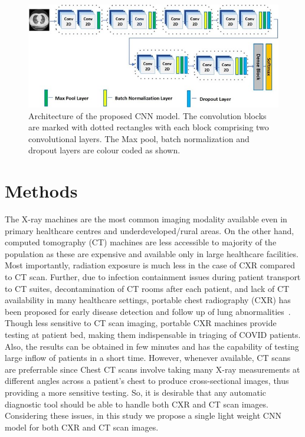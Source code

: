 \documentclass[10pt,journal,compsoc]{IEEEtran}
\begin{document}
\begin{figure}[!t]
\centering
\includegraphics[width=7.0in]{Picture1.jpg}
\caption{Architecture of the proposed CNN model. The convolution blocks are marked with dotted rectangles with each block comprising two convolutional layers. The Max pool, batch normalization and dropout layers are colour coded as shown.}
\label{fig_1}
\end{figure}

\section{Methods}
The X-ray machines are the most common imaging modality available even in primary healthcare centres and underdeveloped/rural areas. On the other hand, computed tomography (CT) machines are less accessible to majority of the population as these are expensive and available only in large healthcare facilities. Most importantly, radiation exposure is much less in the case of CXR compared to CT scan. Further, due to infection containment issues during patient transport to CT suites, decontamination of CT rooms after each patient, and lack of CT availability in many healthcare settings, portable chest radiography (CXR) has been proposed for early disease detection and follow up of lung abnormalities~\cite{jacobi2020portable}. Though less sensitive to CT scan imaging, portable CXR machines provide testing at patient bed, making them indispensable in triaging of COVID patients. Also, the results can be obtained in few minutes and has the capability of testing large inflow of patients in a short time. However, whenever available, CT scans are preferrable since Chest CT scans involve taking many X-ray measurements at different angles across a patient’s chest to produce cross-sectional images, thus providing a more sensitive testing. So, it is desirable that any automatic diagnostic tool should be able to handle both CXR and CT scan images. Considering these issues, in this study we propose a single light weight CNN model for both CXR and CT scan images.
\end{document}
